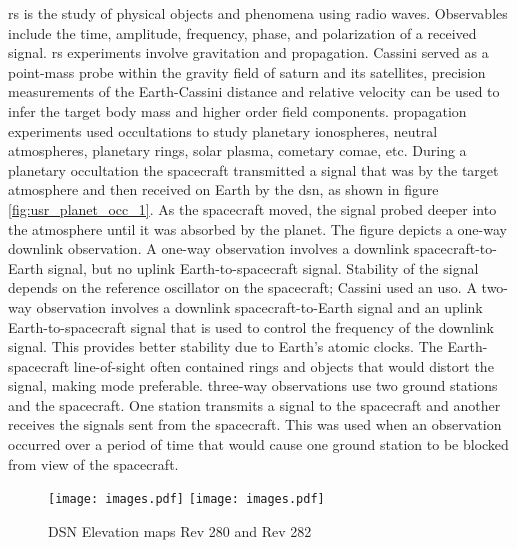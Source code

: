 \documentclass{article}
\theoremstyle{mystyle}
\begin{document}
\gls{rs} is the study of physical objects and phenomena using \gls{radio waves}. Observables include the time, \gls{amplitude}, \gls{frequency}, \gls{phase}, and \gls{polarization} of a received signal. \gls{rs} experiments involve \gls{gravitation} and \gls{propagation}. Cassini served as a point-mass probe within the gravity field of \gls{saturn} and its satellites, precision measurements of the Earth-Cassini distance and \gls{relative velocity} can be used to infer the target body mass and higher order field components. \Gls{propagation} experiments used \glspl{occultation} to study planetary \glspl{ionosphere}, \glspl{neutral atmosphere}, \gls{planetary rings}, \gls{solar plasma}, \gls{cometary comae}, etc. During a planetary \gls{occultation} the spacecraft transmitted a signal that was  by the target atmosphere and then received on Earth by the \gls{dsn}, as shown in figure \ref{fig:usr_planet_occ_1}. As the spacecraft moved, the signal probed deeper into the atmosphere until it was absorbed by the planet. The figure depicts a one-way \gls{downlink} observation. A \gls{one-way observation} involves a \gls{downlink} spacecraft-to-Earth signal, but no \gls{uplink} Earth-to-spacecraft signal. Stability of the signal depends on the reference \gls{oscillator} on the spacecraft; Cassini used an \gls{uso}. A \gls{two-way observation} involves a \gls{downlink} spacecraft-to-Earth signal and an \gls{uplink} Earth-to-spacecraft signal that is used to control the frequency of the \gls{downlink} signal. This provides better stability due to Earth's atomic clocks. The Earth-spacecraft line-of-sight often contained rings and objects that would distort the signal, making  mode preferable. \Glspl{three-way observation} use two ground stations and the spacecraft. One station transmits a signal to the spacecraft and another receives the signals sent from the spacecraft. This was used when an observation occurred over a period of time that would cause one ground station to be blocked from view of the spacecraft.  

\begin{figure}[H]
	\centering
	\texttt{[image: images.pdf]}
	\hfill
	\texttt{[image: images.pdf]}
	\caption{DSN Elevation maps Rev 280 and Rev 282}
	\label{fig:usr_dsn_elav_map_1}
\end{figure}
\end{document}

